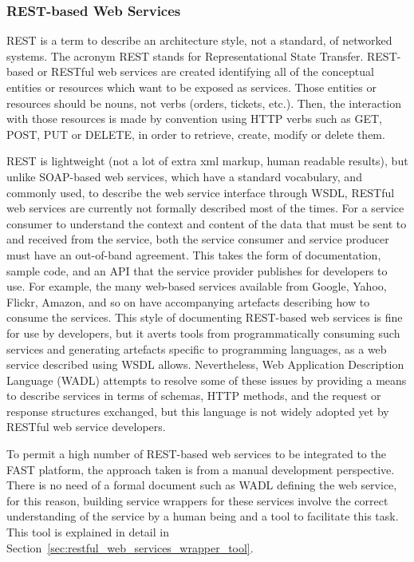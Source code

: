 \documentclass{fast_latex}
\begin{document}
\subsubsection{REST-based Web Services} %
\label{ssub:rest_based_web_services}

REST is a term to describe an architecture style, not a standard, of networked systems. The acronym REST stands for Representational State Transfer. REST-based or RESTful web services \cite{Fielding2000} are created identifying all of the conceptual entities or resources which want to be exposed as services. Those entities or resources should be nouns, not verbs (orders, tickets, etc.). Then, the interaction with those resources is made by convention using HTTP verbs such as GET, POST, PUT or DELETE, in order to retrieve, create, modify or delete them.

REST is lightweight (not a lot of extra xml markup, human readable results), but unlike SOAP-based web services, which have a standard vocabulary, and commonly used, to describe the web service interface through WSDL, RESTful web services are currently not formally described most of the times. For a service consumer to understand the context and content of the data that must be sent to and received from the service, both the service consumer and service producer must have an out-of-band agreement. This takes the form of documentation, sample code, and an API that the service provider publishes for developers to use. For example, the many web-based services available from Google, Yahoo, Flickr, Amazon, and so on have accompanying artefacts describing how to consume the services. This style of documenting REST-based web services is fine for use by developers, but it averts tools from programmatically consuming such services and generating artefacts specific to programming languages, as a web service described using WSDL allows. Nevertheless, Web Application Description Language (WADL) attempts to resolve some of these issues by providing a means to describe services in terms of schemas, HTTP methods, and the request or response structures exchanged, but this language is not widely adopted yet by RESTful web service developers.

To permit a high number of REST-based web services to be integrated to the FAST platform, the approach taken is from a manual development perspective. There is no need of a formal document such as WADL defining the web service, for this reason, building service wrappers for these services involve the correct understanding of the service by a human being and a tool to facilitate this task. This tool is explained in detail in Section~\ref{sec:restful_web_services_wrapper_tool}.
\end{document}
